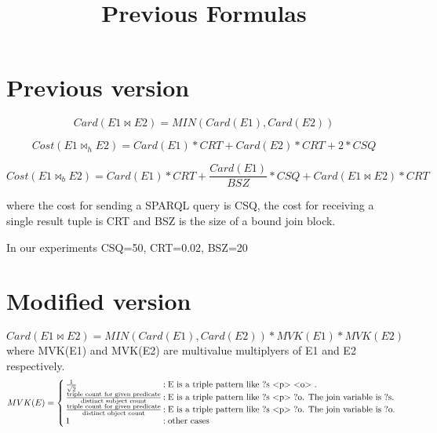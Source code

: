 \documentclass[11pt]{article} %
\title{Previous Formulas}
\date{}
\begin{document}
\maketitle

\section{Previous version}

\begin{equation}
Card(E1 \bowtie E2) = MIN(Card(E1), Card(E2))
\end{equation}

\begin{equation}
Cost(E1 \bowtie_h E2) = Card(E1) * CRT + Card(E2) * CRT + 2 * CSQ
\end{equation}

\begin{equation}
Cost(E1 \bowtie_b E2) = Card(E1) * CRT + \frac{Card(E1)}{BSZ}* CSQ  + Card(E1 \bowtie E2) * CRT
\end{equation}

where the cost for sending a SPARQL query is CSQ, the cost for receiving a single result tuple is CRT and BSZ is the size of a bound join block.

In our experiments CSQ=50, CRT=0.02, BSZ=20

\section{Modified version}
\begin{equation}
Card(E1 \bowtie E2) = MIN(Card(E1), Card(E2)) * MVK(E1) *  MVK(E2)
\end{equation}
where  MVK(E1) and  MVK(E2) are multivalue multiplyers of E1 and E2 respectively.
\[
   MVK(E)= \left\{
     \begin{array}{@{\thinspace}l@{\thinspace}l}
       \frac{1}{\sqrt{2}}  &: \text{E is a triple pattern like ?s $<$p$>$  $<$o$>$ . }\\
       \frac{\text{triple count for given predicate}}{\text{distinct subject count}} &: \text{E is a triple pattern like ?s $<$p$>$  ?o. The join variable is ?s.} \\
       \frac{\text{triple count for given predicate}}{\text{distinct object count}} &: \text{E is a triple pattern like ?s $<$p$>$  ?o. The join variable is ?o.} \\
       \text{1} &: \text{other cases}
     \end{array}
   \right.
\]
\end{document}
